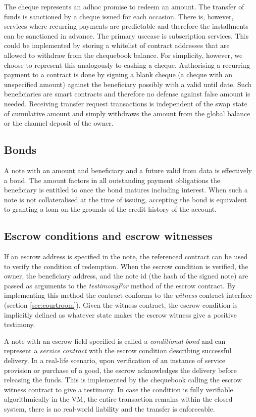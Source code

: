 \documentclass[a4paper,10pt]{article}
\newcommand\gloss[1]{\emph{\gls{#1}}}
\begin{document}
The cheque represents an adhoc promise to redeem an amount.
The transfer of funds is sanctioned by a cheque issued for each occasion.
There is, however, services where recurring payments are predictable and therefore
the installments can be sanctioned in advance. The primary usecase is subscription
services.
This could be implemented by storing a whitelist of contract addresses that are allowed
to withdraw from the chequebook balance.
For simplicity, however, we choose to represent this analogously to cashing a cheque.
Authorising a recurring payment to a contract is done by signing a blank cheque (a cheque with
an unspecified amount) against the beneficiary possibly with a valid until date.
Such beneficiaries are smart contracts and therefore no defense against
false amount is needed.
Receiving transfer request transactions is independent of the swap state of cumulative amount
and simply withdraws the amount from the global balance or the channel deposit of the owner.

\subsection{Bonds}

A note with an amount and beneficiary and a future valid from data is effectively a bond.
The amount factors in all outstanding payment obligations the beneficiary is entitled to
once the bond matures including interest. When such a note is not collateralised at the time of issuing,
accepting the bond is equivalent to granting a loan on the grounds of the credit history of the account.

\subsection{Escrow conditions and escrow witnesses}

If an escrow address is specified in the note, the referenced contract can be used to verify the condition
of redemption. When the escrow condition is verified, the owner, the beneficiary address, and
the note id (the hash of the signed note) are passed as arguments to the {\gloss{testimonyFor}} method
of the escrow contract. By implementing this method the contract conforms to the \gloss{witness} contract
 interface
(section \ref{sec:courtroom}). Given the witness contract, the escrow condition is implicitly defined
as whatever state makes the escrow witness give a positive testimony.

A note with an escrow field specified is called a \gloss{conditional bond} and
can represent a \gloss{service contract} with the escrow condition describing successful delivery.
In a real-life scenario, upon verification of an instance of service provision or purchase of a good,
the escrow acknowledges the delivery before releasing the funds.
This is implemented by the chequebook calling the escrow witness contract
to give a testimony. In case the condition is fully verifiable algorithmically in the VM,
the entire transaction remains within the closed system, there is no real-world liability and the transfer
is enforceable.
\end{document}
